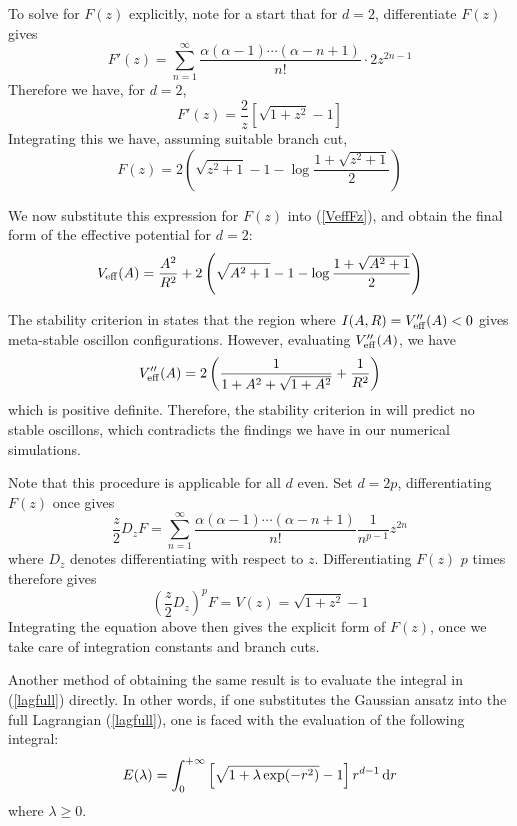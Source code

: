 \documentclass{report}
\begin{document}
To solve for $F(z)$ explicitly, note for a start that for $d=2$, differentiate $F(z)$ gives
\begin{equation}
  F'(z)=\sum_{n=1}^\infty\frac{\alpha(\alpha-1)\cdots(\alpha-n+1)}{n!} \cdot 2 z^{2n-1}
\end{equation}
Therefore we have, for $d=2$,
\begin{equation}
  F'(z)=\frac{2}{z}\left[\sqrt{1+z^2}-1\right]
\end{equation}
Integrating this we have, assuming suitable branch cut,
\begin{equation}
  F(z) = 2 \left(\sqrt{z^2+1}-1-\log \frac{1+\sqrt{z^2+1}}{2}\right)
\end{equation}

We now substitute this expression for $F(z)$ into (\ref{VeffFz}), and obtain the final form of the effective potential for $d=2$:
\begin{equation}
  V_{\rm eff}(A) = \frac{A^2}{R^2} + 2 \left(\sqrt{A^2+1}-1-\log \frac{1+\sqrt{A^2+1}}{2}\right)
\end{equation}

The stability criterion in \cite{Gleiser:2008ty} states that the region where $I(A,R) = V''_{\rm eff}(A)<0$ gives meta-stable oscillon configurations. However, evaluating $V''_{\rm eff}(A)$, we have
\begin{equation}
  V''_{\rm eff}(A) = 2 \left(\frac{1}{1 + A^2 + \sqrt{1 + A^2}} + \frac{1}{R^2}\right)
\end{equation}
which is positive definite. Therefore, the stability criterion in \cite{Gleiser:2008ty} will predict no stable oscillons, which contradicts the findings we have in our numerical simulations.

Note that this procedure is applicable for all $d$ even. Set $d=2p$, differentiating $F(z)$ once gives
\begin{equation}
  \frac{z}{2}D_z F = \sum_{n=1}^\infty\frac{\alpha(\alpha-1)\cdots(\alpha-n+1)}{n!} \frac{1}{n^{p-1}} z^{2n}
\end{equation}
where $D_z$ denotes differentiating with respect to $z$. Differentiating $F(z)$ $p$ times therefore gives
\begin{equation}
  \left(\frac{z}{2}D_z\right)^p F = V(z) = \sqrt{1+z^2}-1
\end{equation}
Integrating the equation above then gives the explicit form of $F(z)$, once we take care of integration constants and branch cuts.

Another method of obtaining the same result is to evaluate the integral in (\ref{lagfull}) directly. In other words, if one substitutes the Gaussian ansatz into the full Lagrangian (\ref{lagfull}), one is faced with the evaluation of the following integral:
\begin{equation}\label{intE}
  E(\lambda) = \int^{+\infty}_0 \left[\sqrt{1+\lambda\exp(-r^2)} -1\right]r^{d-1}\,{\rm d}r
\end{equation}
where $\lambda \ge 0$.%
\end{document}
